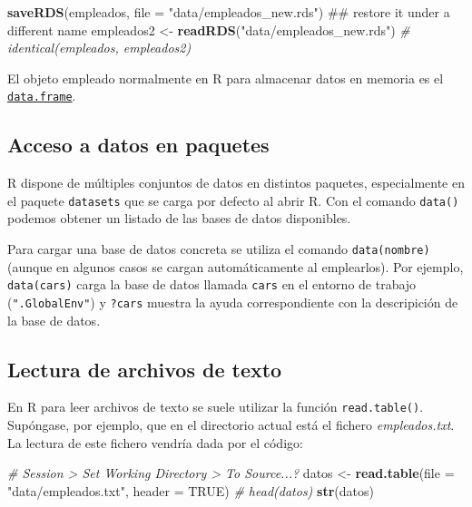\documentclass[]{book}
\newenvironment{Shaded}{\begin{snugshade}}{\end{snugshade}}
\newcommand{\KeywordTok}[1]{\textcolor[rgb]{0.13,0.29,0.53}{\textbf{#1}}}
\newcommand{\DataTypeTok}[1]{\textcolor[rgb]{0.13,0.29,0.53}{#1}}
\newcommand{\StringTok}[1]{\textcolor[rgb]{0.31,0.60,0.02}{#1}}
\newcommand{\CommentTok}[1]{\textcolor[rgb]{0.56,0.35,0.01}{\textit{#1}}}
\newcommand{\OtherTok}[1]{\textcolor[rgb]{0.56,0.35,0.01}{#1}}
\newcommand{\NormalTok}[1]{#1}
\begin{document}
\begin{Shaded}
\begin{Highlighting}[]
\KeywordTok{saveRDS}\NormalTok{(empleados, }\DataTypeTok{file =} \StringTok{"data/empleados_new.rds"}\NormalTok{)}
\NormalTok{## restore it under a different name}
\NormalTok{empleados2 <-}\StringTok{ }\KeywordTok{readRDS}\NormalTok{(}\StringTok{"data/empleados_new.rds"}\NormalTok{)}
\CommentTok{# identical(empleados, empleados2)}
\end{Highlighting}
\end{Shaded}

El objeto empleado normalmente en R para almacenar datos en memoria es
el
\href{https://www.rdocumentation.org/packages/base/versions/3.6.1/topics/data.frame}{\texttt{data.frame}}.

\subsection{Acceso a datos en
paquetes}\label{acceso-a-datos-en-paquetes}

R dispone de múltiples conjuntos de datos en distintos paquetes,
especialmente en el paquete \texttt{datasets} que se carga por defecto
al abrir R. Con el comando \texttt{data()} podemos obtener un listado de
las bases de datos disponibles.

Para cargar una base de datos concreta se utiliza el comando
\texttt{data(nombre)} (aunque en algunos casos se cargan automáticamente
al emplearlos). Por ejemplo, \texttt{data(cars)} carga la base de datos
llamada \texttt{cars} en el entorno de trabajo (\texttt{".GlobalEnv"}) y
\texttt{?cars} muestra la ayuda correspondiente con la descripición de
la base de datos.

\subsection{Lectura de archivos de texto}\label{cap2-texto}

En R para leer archivos de texto se suele utilizar la función
\texttt{read.table()}. Supóngase, por ejemplo, que en el directorio
actual está el fichero \emph{empleados.txt}. La lectura de este fichero
vendría dada por el código:

\begin{Shaded}
\begin{Highlighting}[]
\CommentTok{# Session > Set Working Directory > To Source...?}
\NormalTok{datos <-}\StringTok{ }\KeywordTok{read.table}\NormalTok{(}\DataTypeTok{file =} \StringTok{"data/empleados.txt"}\NormalTok{, }\DataTypeTok{header =} \OtherTok{TRUE}\NormalTok{)}
\CommentTok{# head(datos)}
\KeywordTok{str}\NormalTok{(datos)}
\end{Highlighting}
\end{Shaded}
\end{document}
